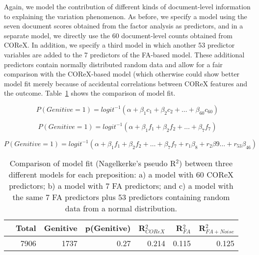 Again, we model the contribution of different kinds of document-level information to explaining the variation phenomenon. As before, we specify a model using the seven document scores obtained from the factor analysis as predictors, and in a separate model, we directly use the 60 document-level counts obtained from COReX. In addition, we specify a third model in which another 53 predictor variables are added to the 7 predictors of the FA-based model. These additional predictors contain normally distributed random data and allow for a fair comparison with the COReX-based model (which otherwise could show better model fit merely because of accidental correlations between COReX features and the outcome.  Table~\ref{mn-results} shows the comparison of model fit.

 
\begin{equation}
\label{mn-glm-allpreps-corex}
  P(Genitive=1) = logit^{-1}(\alpha + \beta_1 c_1 + \beta_2 c_2 + \dots + \beta_{60} c_{60})
\end{equation}



\begin{equation}
\label{mn-glm-allpreps-fa}
  P(Genitive=1) = logit^{-1}(\alpha + \beta_1 f_1 + \beta_2 f_2 + \dots + \beta_{7} f_{7})
\end{equation}


\begin{equation}
\label{mn-glm-allpreps-fa-rr}
  P(Genitive=1) = logit^{-1}(\alpha + \beta_1 f_1 + \beta_2 f_2 + \dots + \beta_{7} f_{7} + r_1 \beta_8 + r_2 \beta9 \ldots + r_{53} \beta_{46})
\end{equation}


\begin{table}
  \begin{tabular}{lrrrrrr}
  \toprule
             & Total  & Genitive & p(Genitive) & R$^2_{COReX}$ & R$^2_{FA}$ & R$^2_{FA+Noise}$\\
  \midrule
            & 7906   & 1737   & 0.27    & 0.214   & 0.115  & 0.125\\
%  
  \bottomrule
  \end{tabular}
  \caption{Comparison of model fit (Nagelkerke's pseudo R$^2$) between three different models for each preposition: a) a model with 60 COReX predictors; b) a model with 7 FA predictors; and c) a model with the same 7 FA predictors plus 53 predictors containing random data from a normal distribution.}\label{mn-results}
\end{table}
%

